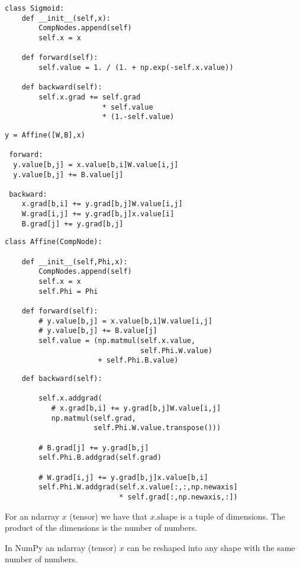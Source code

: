 {\begin{verbatim}
class Sigmoid:
    def __init__(self,x):
        CompNodes.append(self)
        self.x = x

    def forward(self):
        self.value = 1. / (1. + np.exp(-self.x.value))

    def backward(self):
        self.x.grad += self.grad
                       * self.value
                       * (1.-self.value)
\end{verbatim}


\vfill
\eject
\begin{verbatim}
y = Affine([W,B],x)

 forward:
  y.value[b,j] = x.value[b,i]W.value[i,j]
  y.value[b,j] += B.value[j]

 backward:
    x.grad[b,i] += y.grad[b,j]W.value[i,j]
    W.grad[i,j] += y.grad[b,j]x.value[i]
    B.grad[j] += y.grad[b,j]
\end{verbatim}

\vfill
\eject
\begin{verbatim}
class Affine(CompNode):

    def __init__(self,Phi,x):
        CompNodes.append(self)
        self.x = x
        self.Phi = Phi

    def forward(self):
        # y.value[b,j] = x.value[b,i]W.value[i,j]
        # y.value[b,j] += B.value[j]
        self.value = (np.matmul(self.x.value,
                                self.Phi.W.value)
                      + self.Phi.B.value)
\end{verbatim}
\vfill
\eject
\vfill
\begin{verbatim}
    def backward(self):

        self.x.addgrad(
           # x.grad[b,i] += y.grad[b,j]W.value[i,j]
           np.matmul(self.grad,
                     self.Phi.W.value.transpose()))

        # B.grad[j] += y.grad[b,j]
        self.Phi.B.addgrad(self.grad)

        # W.grad[i,j] += y.grad[b,j]x.value[b,i]
        self.Phi.W.addgrad(self.x.value[:,:,np.newaxis]
                           * self.grad[:,np.newaxis,:])
\end{verbatim}



For an ndarray $x$ (tensor) we have that $x.\mathrm{shape}$ is a tuple of dimensions.  The product of the dimensions is the number of numbers.

\vfill
In NumPy an ndarray (tensor) $x$ can be reshaped into any shape with the same number of numbers.

}
